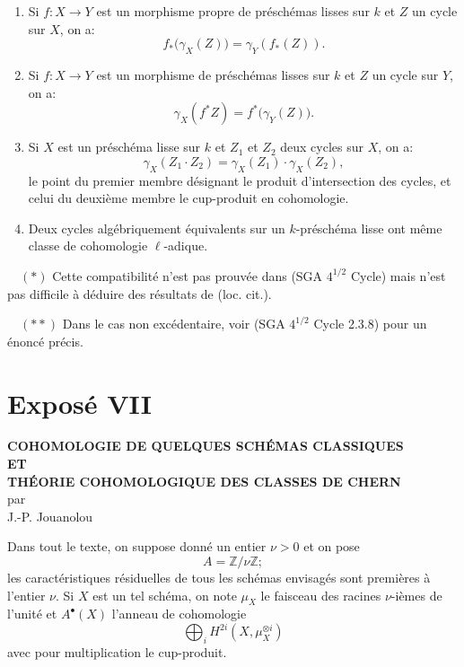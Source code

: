 \documentclass[11pt]{article}
\begin{document}
\begin{enumerate}[label=(\roman*)]
\item Si \(f:X\to Y\) est un morphisme propre de préschémas lisses sur \(k\) et \(Z\) un cycle sur \(X\), on a:
\[
f_*\bigl(\gamma_X(Z)\bigr)=\gamma_Y(f_*(Z)).
\tag{*}
\]

\item Si \(f:X\to Y\) est un morphisme de préschémas lisses sur \(k\) et \(Z\) un cycle sur \(Y\), on a:
\[
\gamma_X(f^*Z)=f^*\bigl(\gamma_Y(Z)\bigr).
\tag{**}
\]

\item Si \(X\) est un préschéma lisse sur \(k\) et \(Z_1\) et \(Z_2\) deux cycles sur \(X\), on a:
\[
\gamma_X(Z_1\cdot Z_2)=\gamma_X(Z_1)\cdot \gamma_X(Z_2),
\tag{**}
\]
le point du premier membre désignant le produit d'intersection des cycles, et celui du deuxième membre le cup-produit en cohomologie.

\item Deux cycles algébriquement équivalents sur un \(k\)-préschéma lisse ont même classe de cohomologie \(\ell\)-adique.
\end{enumerate}

\begin{flushleft}
\(\quad (*)\) Cette compatibilité n'est pas prouvée dans (SGA \(4^{1/2}\) Cycle) mais n'est pas difficile à déduire des résultats de (loc. cit.).

\(\quad (**)\) Dans le cas non excédentaire, voir (SGA \(4^{1/2}\) Cycle 2.3.8) pour un énoncé précis.
\end{flushleft}


\section*{Exposé VII}

\begin{center}
\textbf{COHOMOLOGIE DE QUELQUES SCHÉMAS CLASSIQUES}\\[0.5em]
\textbf{ET}\\[0.5em]
\textbf{THÉORIE COHOMOLOGIQUE DES CLASSES DE CHERN}\\[1em]
par\\[0.5em]
J.-P. Jouanolou
\end{center}

Dans tout le texte, on suppose donné un entier $\nu>0$ et on pose
\[
A=\mathbb Z/\nu\mathbb Z;
\]
les caractéristiques résiduelles de tous les schémas envisagés sont premières à l'entier $\nu$. Si $X$ est un tel schéma, on note $\mu_X$ le faisceau des racines $\nu$-ièmes de l'unité et $A^{\bullet}(X)$ l'anneau de cohomologie
\[
\bigoplus_i H^{2i}(X,\mu_X^{\otimes i})
\]
avec pour multiplication le cup-produit.
\end{document}
